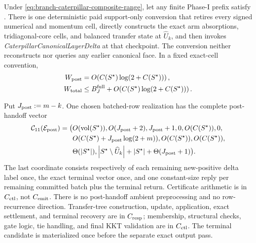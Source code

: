 \begin{theorem}
\label{thm:branch-caterpillar-composite-response-handoff}
Under \cref{eq:branch-caterpillar-composite-range}, let any finite Phase-I
prefix satisfy
.  There is one
deterministic paid support-only conversion that retires every signed numerical
and momentum cell, directly constructs the exact arm absorptions,
tridiagonal-core cells, and balanced transfer state at $\widehat U_k$, and
then invokes \emph{CaterpillarCanonicalLayerDelta} at that checkpoint.  The
conversion neither reconstructs nor queries any earlier canonical face.  In a
fixed exact-cell convention,
\begin{align}
 W_{\rm post}
 &=O\!\left(C(S^\star)\log(2+C(S^\star))\right),
 \notag\\
 W_{\rm total}
 &\leq B_J^{\rm full}
   +O\!\left(C(S^\star)\log(2+C(S^\star))\right).
 \label{eq:branch-caterpillar-composite-work}
\end{align}

Put $J_{\rm post}:=m-k$.  One chosen batched-row realization has the complete
post-handoff vector
\begin{equation}
 \begin{aligned}
 \mathcal C_{11}(\mathcal E_{\rm post})=\bigl(&
 O(\operatorname{vol}(S^\star)),O(J_{\rm post}+2),J_{\rm post}+1,0,
 O(C(S^\star)),0,\\
 &O(C(S^\star)+J_{\rm post}\log(2+m)),
 O(C(S^\star)),O(C(S^\star)),\\
 &\Theta(\left\lvert S^\star \right\rvert),
 \left\lvert S^\star\setminus\widehat U_k \right\rvert
 +\left\lvert S^\star \right\rvert+\Theta(J_{\rm post}+1)\bigr).
 \end{aligned}
 \label{eq:branch-caterpillar-composite-eleven-vector}
\end{equation}
The last coordinate consists respectively of each remaining new-positive
delta label once, the exact terminal vector once, and one constant-size reply
per remaining committed batch plus the terminal return.  Certificate
arithmetic is in $C_{\rm ctl}$, not $C_{\rm emit}$.  There is no post-handoff
ambient preprocessing and no row-recurrence direction.  Transfer-tree
construction, update, application, exact settlement, and terminal recovery
are in $C_{\rm resp}$; membership, structural checks, gate logic, tie handling,
and final KKT validation are in $C_{\rm ctl}$.  The terminal candidate is
materialized once before the separate exact output pass.


\end{theorem}
